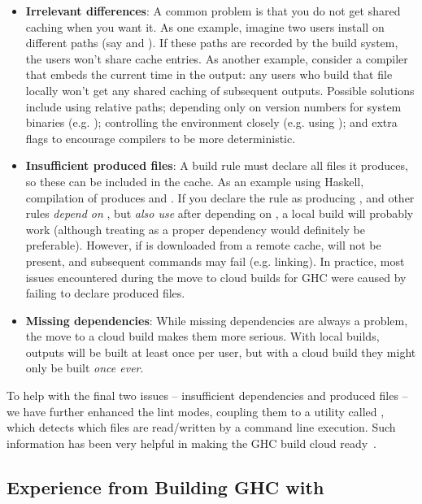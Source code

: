 \begin{itemize}
\item \textbf{Irrelevant differences}: A common problem is that you do not get
      shared caching when you want it. As one example, imagine two users install
       on different paths (say  and ).
      If these paths are recorded by the build system, the users won't share
      cache entries. As another example, consider a compiler that embeds the current time
      in the output: any users who build that file locally won't get any shared
      caching of subsequent outputs. Possible solutions include using relative paths;
      depending only on version numbers for system binaries (e.g. );
      controlling the environment closely (e.g. using \Nix); and extra flags to
      encourage compilers to be more deterministic.
\item \textbf{Insufficient produced files}: A build rule must declare all files
      it produces, so these can be included in the cache.
      As an example using Haskell, compilation of  produces
       and . If you declare the rule as producing ,
      and other rules \emph{depend on} , but \emph{also use}  after
      depending on , a local build will probably work (although treating 
      as a proper dependency would definitely be preferable). However,
      if  is downloaded from a remote cache,  will not be present,
      and subsequent commands may fail (e.g. linking).
      In practice, most issues encountered
      during the move to cloud builds for GHC were caused by failing to declare produced
      files.
\item \textbf{Missing dependencies}: While missing dependencies are
      always a problem, the move to a cloud build makes them more serious.
      With local builds, outputs will be built at least once per user, but with a
      cloud build they might only be built \emph{once ever}.
\end{itemize}

To help with the final two issues -- insufficient dependencies and produced
files -- we have further enhanced the \Shake lint modes, coupling them to a
utility called , which detects which files are read/written by a
command line execution. Such information has been very helpful in making the GHC
build cloud ready~\cite{cloud_hadrian}.

\subsection{Experience from Building GHC with \Shake}\label{sec-hadrian}

